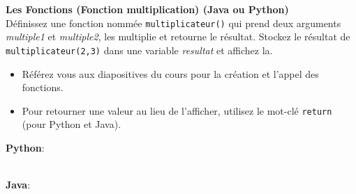     \begin{Exercice}[5 minutes] \textbf{Les Fonctions (Fonction multiplication) (Java ou Python)}\\
    Définissez une fonction nommée \lstinline{multiplicateur()} qui prend deux arguments \textit{multiple1} et \textit{multiple2}, les multiplie et retourne le résultat. Stockez le résultat de \lstinline{multiplicateur(2,3)} dans une variable \textit{resultat} et affichez la.   \\

    \begin{conseil}
        \begin{itemize}
            \item Référez vous aux diapositives du cours pour la création et l'appel des fonctions.
            \item Pour retourner une valeur au lieu de l'afficher, utilisez le mot-clé \lstinline{return} (pour Python et Java).
        \end{itemize}        
    \end{conseil}
    \begin{solution}
        \textbf{Python}:
        
        
        \textbf{\\Java}:
        
    \end{solution}   
\end{Exercice} 
  
